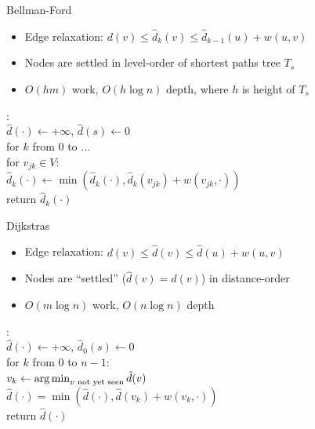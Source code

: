 \documentclass[aspectratio=169]{beamer}
\newcommand{\pauseitem}{\onslide<+-> \item}
\begin{document}
\begin{frame}{Bellman-Ford}
    \begin{itemize}
        \pauseitem Edge relaxation: $d(v) \le \hat{d}_k(v) \le \hat{d}_{k-1}(u) + w(u, v)$
        \pauseitem Nodes are settled in level-order of shortest paths tree $T_s$
        \pauseitem $O(h m)$ work, $O(h \log n)$ depth, where $h$ is height of $T_s$
    \end{itemize}

    \vspace{\baselineskip}
    \begin{algo}
        : \+
        \\ $\hat{d}(\cdot) \gets + \infty$, $\hat{d}(s) \gets 0$
        \\ for $k$ from $0$ to $\ldots$
        \+ \\ for $v_{jk} \in V$: \-
        \+ \+ \\ $\hat{d}_k(\cdot) \gets \min( \hat{d}_k(\cdot), \hat{d}_k(v_{jk}) + w(v_{jk}, \cdot) )$ \- \-
        \\ return $\hat{d}_k(\cdot)$
    \end{algo}
\end{frame}

\begin{frame}{Dijkstras}
    \begin{itemize}
        \pauseitem Edge relaxation\footnotemark: $d(v) \le \hat{d}(v) \le \hat{d}(u) + w(u, v)$
        \pauseitem Nodes are ``settled'' ($\hat{d}(v) = d(v)$) in distance-order
        \pauseitem $O(m \log n)$ work, $O(n \log n)$ depth
    \end{itemize}

    \vspace{\baselineskip}
    \begin{algo}
        : \+
        \\ $\hat{d}(\cdot) \gets + \infty$, $\hat{d}_0(s) \gets 0$
        \\ for $k$ from $0$ to $n-1$:
        \+ \\ $v_k \gets \argmin_{v \text{ not yet seen}} \hat{d}(v)$ \-
        \+ \\ $\hat{d}(\cdot) = \min( \hat{d}(\cdot), \hat{d}(v_k) + w(v_k, \cdot) )$ \-
        \\ return $\hat{d}(\cdot)$
    \end{algo}

\end{frame}
\end{document}
